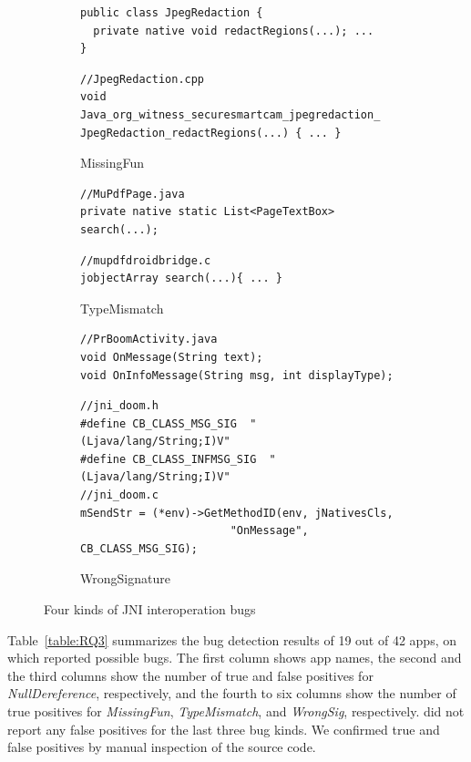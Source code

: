 \begin{figure}[t]
\begin{subfigure}[t]{0.5\textwidth}
\begin{lstlisting}[style=java,xleftmargin=2.5em]
public class JpegRedaction {
  private native void redactRegions(...); ...
}
    \end{lstlisting}
    \begin{lstlisting}[style=cpp,xleftmargin=2.5em]
//JpegRedaction.cpp
void Java_org_witness_securesmartcam_jpegredaction_ JpegRedaction_redactRegions(...) { ... }
    \end{lstlisting}
    \vspace*{-.5em}
    \caption{MissingFun}
    \label{fig:bug2}
  \end{subfigure}
  \begin{subfigure}[t]{0.5\textwidth}
    \begin{lstlisting}[style=java,xleftmargin=2.5em]
//MuPdfPage.java
private native static List<PageTextBox> search(...);
    \end{lstlisting}
    \begin{lstlisting}[style=cpp,xleftmargin=2.5em]
//mupdfdroidbridge.c
jobjectArray search(...){ ... }
    \end{lstlisting}
    \vspace*{-.5em}
    \caption{TypeMismatch}
    \label{fig:bug3}
  \end{subfigure}
  \begin{subfigure}[t]{0.5\textwidth}
    \begin{lstlisting}[style=java,xleftmargin=2.5em]
//PrBoomActivity.java
void OnMessage(String text);
void OnInfoMessage(String msg, int displayType);
    \end{lstlisting}
    \begin{lstlisting}[style=cpp,xleftmargin=2.5em]
//jni_doom.h
#define CB_CLASS_MSG_SIG  "(Ljava/lang/String;I)V"
#define CB_CLASS_INFMSG_SIG  "(Ljava/lang/String;I)V"
//jni_doom.c
mSendStr = (*env)->GetMethodID(env, jNativesCls,
                       "OnMessage", CB_CLASS_MSG_SIG);
    \end{lstlisting}
    \vspace*{-.5em}
    \caption{WrongSignature}
    \label{fig:bug3}
  \end{subfigure}
  \vspace*{-.5em}
  \caption{Four kinds of JNI interoperation bugs}
  \label{fig:bugs}
  \vspace*{-1em}
\end{figure}

Table~\ref{table:RQ3} summarizes the bug detection results of 19 out of 42
apps, on which \ours reported possible bugs.  The first
column shows app names, the second and the third columns show the
number of true and false positives for {\it NullDereference}, respectively, and
the fourth to six columns show the number of true positives for {\it
MissingFun}, {\it TypeMismatch}, and {\it WrongSig}, respectively.
\ours did not report any false positives for the last three bug kinds.
We confirmed true and false positives by manual inspection of the source code. 

